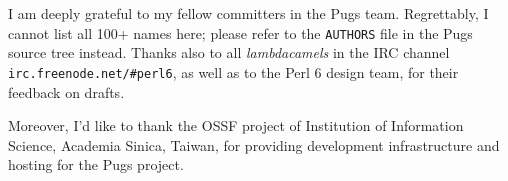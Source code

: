 \documentclass[]{sigplanconf}
\newcommand{\code}[1]{\texttt{#1}}
\begin{document}
I am deeply grateful to my fellow committers in the Pugs team.  Regrettably, I
cannot list all 100+ names here; please refer to the \code{AUTHORS} file in the
Pugs source tree instead.  Thanks also to all \emph{lambdacamels} in the IRC
channel \texttt{irc.freenode.net/\#perl6}, as well as to the Perl 6 design
team, for their feedback on drafts.

Moreover, I'd like to thank the OSSF project of Institution of Information
Science, Academia Sinica, Taiwan, for providing development infrastructure and
hosting for the Pugs project.





\appendix
\end{document}
